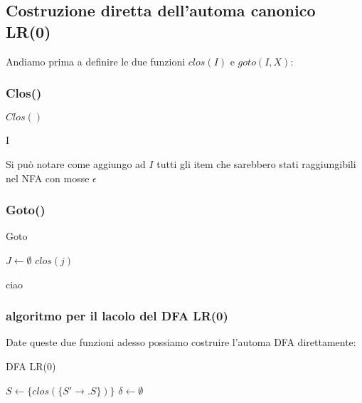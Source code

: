 \subsection{Costruzione diretta dell’automa canonico LR(0)}
Andiamo prima a definire le due funzioni $clos(I)$ e $goto(I,X)$:

\subsubsection{Clos()}
\begin{algorithm}
    \caption{$Clos()$}

    \Return I\;
\end{algorithm}

Si può notare come aggiungo ad $I$  tutti gli item che sarebbero stati raggiungibili nel NFA con mosse $\epsilon$
\subsubsection{Goto()}

\begin{algorithm}
    \caption{Goto}

    $J \gets \emptyset$\;
    \Return $clos(j)$ 
\end{algorithm}

ciao


\subsubsection{algoritmo per il lacolo del DFA LR(0)}
Date queste due funzioni adesso possiamo costruire l’automa DFA direttamente:

\begin{algorithm}
    \caption{DFA LR(0)}
    $S \gets \{clos(\{S' \to .S\})\}$\;
    $\delta\gets \emptyset$\;
\end{algorithm}


